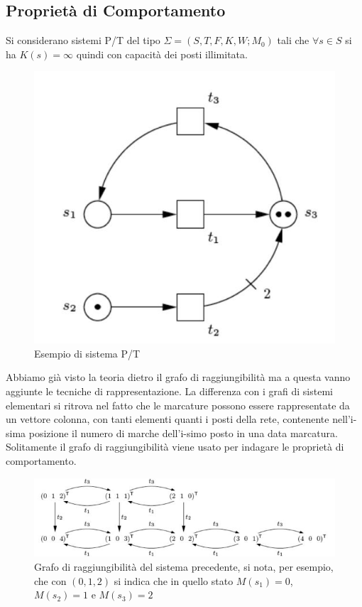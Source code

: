 \documentclass[a4paper,12pt, oneside]{book}
\begin{document}
\subsection{Proprietà di Comportamento}
Si considerano sistemi P/T del tipo $\Sigma=(S,T,F,K,W;M_0)$ tali che $\forall
s\in S$ si ha $K(s)=\infty$ quindi con capacità dei posti illimitata.
\begin{figure}[H]
  \centering
  \includegraphics[scale = 0.35]{img/ptc.jpg}
  \caption{Esempio di sistema P/T}
\end{figure}
Abbiamo già visto la teoria dietro il grafo di raggiungibilità ma a questa vanno
aggiunte le tecniche di rappresentazione. La differenza con i grafi di sistemi
elementari si ritrova nel fatto che le marcature possono essere rappresentate da
un vettore colonna, con tanti elementi quanti i posti della rete, contenente
nell'i-sima posizione il numero di marche dell'i-simo posto in una data 
marcatura.\\
Solitamente il grafo di raggiungibilità viene usato per indagare le proprietà di
comportamento.
\begin{figure}[H]
  \centering
  \includegraphics[scale = 0.65]{img/ptc2.jpg}
  \caption{Grafo di raggiungibilità del sistema precedente, si nota, per
    esempio, che con $(0,1,2)$ si indica che in quello stato
    $M(s_1)=0$,$M(s_2)=1$ e $M(s_3)=2$ } 
\end{figure}
\end{document}
